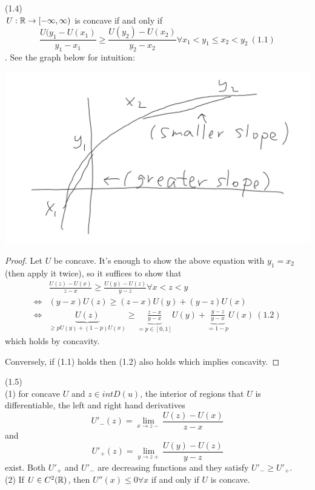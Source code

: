 \documentclass[a4paper]{article}
\begin{document}
\begin{prop} (1.4)\\
$U:\mathbb{R} \to [-\infty,\infty)$ is concave if and only if $$\frac{U(y_1 - U(x_1)}{y_1-x_1} \geq \frac{U(y_2) - U(x_2)}{y_2-x_2} \forall x_1 < y_1 \leq x_2 < y_2 \ (1.1)$$ . See the graph below for intuition:

\includegraphics[scale=0.5]{image/SFM_01.png}

\begin{proof}
Let $U$ be concave. It's enough to show the above equation with $y_1 = x_2$ (then apply it twice), so it suffices to show that 
\begin{equation*}
\begin{aligned}
&\frac{U(z) - U(x)}{z-x} \geq \frac{U(y) - U(z)}{y-z} \forall x < z <y\\
\iff &(y-x)U(z) \geq (z-x) U(y) + (y-z)U(x)\\
\iff &\underbrace{U(z)}_{\geq pU(y)+(1-p)U(x)} \geq \underbrace{\frac{z-x}{y-x}}_{=p \in [0,1]} U(y) + \underbrace{\frac{y-z}{y-x}}_{=1-p} U(x) \ (1.2)
\end{aligned}
\end{equation*}
which holds by concavity.

Conversely, if (1.1) holds then (1.2) also holds which implies concavity.
\end{proof}
\end{prop}

\begin{coro} (1.5)\\
(1) for concave $U$ and $z \in int D(u)$, the interior of regions that $U$ is differentiable, the left and right hand derivatives $$U'_{-}(z) = \lim_{x \to z-} \frac{U(z) - U(x)}{z-x}$$ and $$U'_{+}(z) = \lim_{y \to z+} \frac{U(y) - U(z)}{y-z}$$ exist. Both $U'_+$ and $U'_-$ are decreasing functions and they satisfy $U'_- \geq U'_+$.\\
(2) If $U \in C^2(\mathbb{R})$, then $U''(x) \leq 0 \forall x$ if and only if $U$ is concave.
\end{coro}
\end{document}
